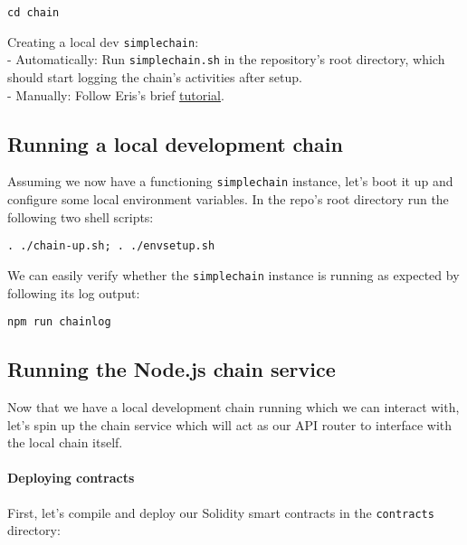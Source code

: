 \begin{verbatim}
cd chain
\end{verbatim}

Creating a local dev \texttt{simplechain}:\\
- Automatically: Run \texttt{simplechain.sh} in the repository's root
directory, which should start logging the chain's activities after
setup.\\
- Manually: Follow Eris's brief
\href{https://docs.erisindustries.com/tutorials/chain-making/}{tutorial}.

\subsection{Running a local development
chain}\label{running-a-local-development-chain}

Assuming we now have a functioning \texttt{simplechain} instance, let's
boot it up and configure some local environment variables. In the repo's
root directory run the following two shell scripts:

\begin{verbatim}
. ./chain-up.sh; . ./envsetup.sh
\end{verbatim}

We can easily verify whether the \texttt{simplechain} instance is
running as expected by following its log output:

\begin{verbatim}
npm run chainlog
\end{verbatim}

\subsection{Running the Node.js chain
service}\label{running-the-node.js-chain-service}

Now that we have a local development chain running which we can interact
with, let's spin up the chain service which will act as our API router
to interface with the local chain itself.

\paragraph{Deploying contracts}\label{deploying-contracts}

First, let's compile and deploy our Solidity smart contracts in the
\texttt{contracts} directory:

\begin{Shaded}
\begin{Highlighting}[]
 
\end{Highlighting}
\end{Shaded}

